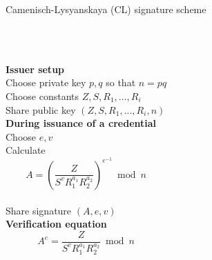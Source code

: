 \begin{frame}{Camenisch-Lysyanskaya (CL) signature scheme}
  \begin{columns}[onlytextwidth]
    \\~\\
    \textbf{Issuer setup}\\
    Choose private key $p,q$ so that $n = pq$\\
    Choose constants $Z, S, R_1,...,R_i$\\
    Share public key $(Z, S, R_1,...,R_i, n)$\\[1em]
    \textbf{During issuance of a credential}\\
    Choose $e, v$\\
    Calculate\\
    $$A= \left(\frac{Z}{S^v R_1^{a_1}R_2^{a_2}}\right)^{e^{-1}} \bmod n$$\\[1em]
    Share signature $(A,e,v)$\\[1em]
    \textbf{Verification equation}\\
      \boldmath$$A^e= \frac{Z}{S^v R_1^{a_1}R_2^{a_2}} \bmod n$$\\
      \unboldmath
      \vspace{5em}
  \end{columns}
\end{frame}

